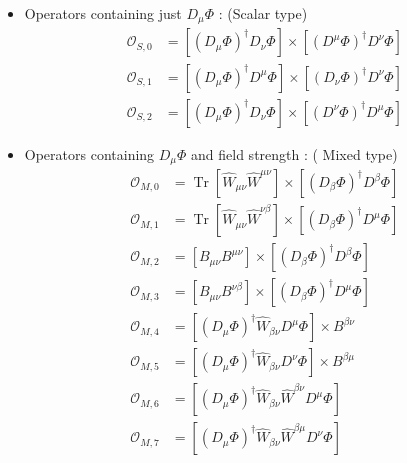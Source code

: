 \begin{itemize}
\item Operators containing just $D_\mu \Phi$ : (Scalar type)
\begin{equation}
\label{eq:OpratorFS}
\begin{aligned}
\mathcal{O}_{S, 0} &=\left[\left(D_{\mu} \Phi\right)^{\dagger} D_{\nu} \Phi\right] \times\left[\left(D^{\mu} \Phi\right)^{\dagger} D^{\nu} \Phi\right] \\
\mathcal{O}_{S, 1} &=\left[\left(D_{\mu} \Phi\right)^{\dagger} D^{\mu} \Phi\right] \times\left[\left(D_{\nu} \Phi\right)^{\dagger} D^{\nu} \Phi\right] \\
\mathcal{O}_{S, 2} &=\left[\left(D_{\mu} \Phi\right)^{\dagger} D_{\nu} \Phi\right] \times\left[\left(D^{\nu} \Phi\right)^{\dagger} D^{\mu} \Phi\right]
\end{aligned}
\end{equation}
\item Operators containing $D_\mu \Phi$ and field strength : ( Mixed type)
\begin{equation}
\label{eq:OpratorFM}
\begin{aligned}
\mathcal{O}_{M, 0} &=\operatorname{Tr}\left[\hat{W}_{\mu \nu} \hat{W}^{\mu \nu}\right] \times\left[\left(D_{\beta} \Phi\right)^{\dagger} D^{\beta} \Phi\right] \\
\mathcal{O}_{M, 1} &=\operatorname{Tr}\left[\hat{W}_{\mu \nu} \hat{W}^{\nu \beta}\right] \times\left[\left(D_{\beta} \Phi\right)^{\dagger} D^{\mu} \Phi\right] \\
\mathcal{O}_{M, 2} &=\left[B_{\mu \nu} B^{\mu \nu}\right] \times\left[\left(D_{\beta} \Phi\right)^{\dagger} D^{\beta} \Phi\right] \\
\mathcal{O}_{M, 3} &=\left[B_{\mu \nu} B^{\nu \beta}\right] \times\left[\left(D_{\beta} \Phi\right)^{\dagger} D^{\mu} \Phi\right] \\
\mathcal{O}_{M, 4} &=\left[\left(D_{\mu} \Phi\right)^{\dagger} \hat{W}_{\beta \nu} D^{\mu} \Phi\right] \times B^{\beta \nu} \\
\mathcal{O}_{M, 5} &=\left[\left(D_{\mu} \Phi\right)^{\dagger} \hat{W}_{\beta \nu} D^{\nu} \Phi\right] \times B^{\beta \mu} \\
\mathcal{O}_{M, 6} &=\left[\left(D_{\mu} \Phi\right)^{\dagger} \hat{W}_{\beta \nu} \hat{W}^{\beta \nu} D^{\mu} \Phi\right] \\
\mathcal{O}_{M, 7} &=\left[\left(D_{\mu} \Phi\right)^{\dagger} \hat{W}_{\beta \nu} \hat{W}^{\beta \mu} D^{\nu} \Phi\right]
\end{aligned} 

\end{equation}
\end{itemize}

